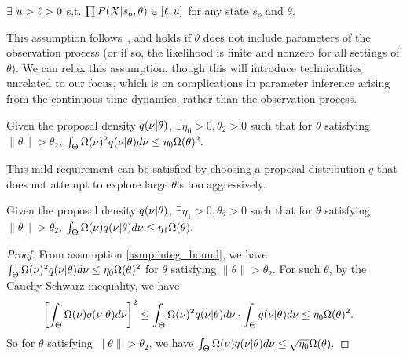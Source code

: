 \begin{assumption}
$\exists$ $ u > \ell > 0$ s.t.
$\prod P(X | s_o, \theta) \in [\ell, u]$ for any state $s_o$ and $\theta$.%
  \label{asmp:obs_bnd}
\end{assumption}
\noindent This assumption follows~\cite{miasojedow2017}, and holds if
$\theta$ does not include parameters of the observation process (or if so,
the likelihood is finite and nonzero for all settings of $\theta$). We can relax this assumption,
though this will introduce technicalities unrelated to our focus, which 
is on complications in parameter inference arising from the continuous-time
dynamics, rather than the observation process. 

\begin{assumption}
Given the proposal density $q(\nu | \theta)$, $\exists \eta_0 > 0, \theta_2 > 0$ 
such that for $\theta$ satisfying $\| \theta \|  > \theta_2$, 
$ \int_\Theta \Omega(\nu)^2 q(\nu | \theta)d\nu \leq \eta_0 \Omega(\theta)^2.$
\label{asmp:integ_bound}
\end{assumption}
\noindent This mild requirement can be satisfied by choosing a proposal 
distribution $q$ that does not attempt to explore large $\theta$'s too 
aggressively.
\begin{corollary}
Given the proposal density $q(\nu | \theta)$, $\exists \eta_1 > 0, \theta_2 > 0$ such that for $\theta$ 
satisfying $\| \theta \|  > \theta_2$, 
$ \int_\Theta \Omega(\nu) q(\nu | \theta)d\nu \leq \eta_1 \Omega(\theta).$
\label{corol:integ_bound}
\end{corollary}
\begin{proof}
From assumption \ref{asmp:integ_bound},  we have $ \int_\Theta \Omega(\nu)^2 q(\nu | \theta)d\nu \leq \eta_0 \Omega(\theta)^2$ for $\theta$ satisfying $\| \theta \|  > \theta_2$.
For such $\theta$, by the Cauchy-Schwarz inequality, we have
\begin{align*}
\left[ \int_\Theta \Omega(\nu) q(\nu | \theta) d\nu \right]^2 &\le \int_\Theta \Omega(\nu)^2 q(\nu | \theta) d\nu \cdot \int_\Theta q(\nu | \theta) d\nu \le \eta_0 \Omega(\theta)^2.
\end{align*}
So for $\theta$ satisfying $\| \theta \|  > \theta_2$, we have $\int_\Theta \Omega(\nu) q(\nu | \theta) d\nu \le \sqrt{\eta_0} \Omega(\theta).$
\end{proof}

